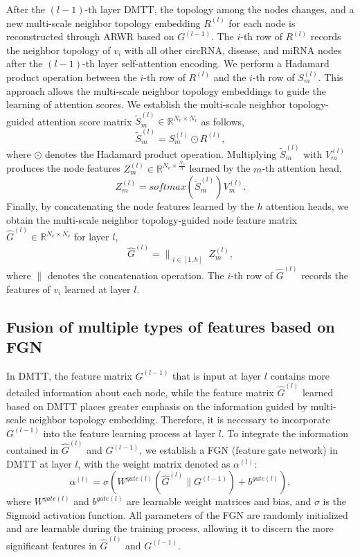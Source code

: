 \documentclass{bioinfo}
\begin{document}
\begin{methods}
After the $(l-1)$-th layer DMTT, the topology among the nodes changes, and a new multi-scale neighbor topology embedding $R^{(l)}$ for each node is reconstructed through ARWR based on $G^{(l - 1)}$. The $i$-th row of $R^{(l)}$ records the neighbor topology of $v_i$ with all other circRNA, disease, and miRNA nodes after the $(l-1)$-th layer self-attention encoding. We perform a Hadamard product operation between the $i$-th row of $R^{(l)}$ and the $i$-th row of $S_{m}^{(l)}$. This approach allows the multi-scale neighbor topology embeddings to guide the learning of attention scores. We establish the multi-scale neighbor topology-guided attention score matrix $\widetilde{S}_{m}^{(l)} \in \mathbb{R}^{N_v \times N_v}$ as follows,
\begin{equation}
	\widetilde{S}_{m}^{(l)} = S_{m}^{(l)} \odot R^{(l)},
\end{equation}
where $\odot$ denotes the Hadamard product operation. Multiplying $\widetilde{S}_{m}^{(l)}$ with $V_{m}^{(l)}$ produces the node features ${Z_{m}^{(l)}} \in \mathbb{R}^{N_v \times \frac{N_v}{h}}$ learned by the $m$-th attention head,
\begin{equation}
	{Z_{m}^{(l)}} = softmax(\widetilde{S}_{m}^{(l)})V_{m}^{(l)}.
\end{equation}
Finally, by concatenating the node features learned by the $h$ attention heads, we obtain the multi-scale neighbor topology-guided node feature matrix $\hat{G}^{(l)} \in \mathbb{R}^{N_v \times N_v}$ for layer $l$,
\begin{equation}
	\hat{G}^{(l)}= \bigg\|_{\substack{i\in {[1,h]}}} Z^{(l)}_{m},
\end{equation}
where $\|$ denotes the concatenation operation. The $i$-th row of $\hat{G}^{(l)}$ records the features of $v_i$ learned at layer $l$.

\vspace{0.3cm}


\subsection{Fusion of multiple types of features based on FGN}
In DMTT, the feature matrix ${G}^{(l - 1)}$ that is input at layer $l$ contains more detailed information about each node, while the feature matrix $\hat{G}^{(l)}$ learned based on DMTT places greater emphasis on the information guided by multi-scale neighbor topology embedding. Therefore, it is necessary to incorporate ${G}^{(l - 1)}$ into the feature learning process at layer $l$. To integrate the information contained in $\hat{G}^{(l)}$ and $G^{(l - 1)}$, we establish a FGN (feature gate network) in DMTT at layer $l$, with the weight matrix denoted as $\alpha^{(l)}$:
\begin{equation}
    \alpha^{(l)} = \sigma (W^{gate(l)}(\hat{G}^{(l)}\| G^{(l - 1)}) + b^{gate(l)}),
\end{equation}
where $W^{gate(l)}$ and $b^{gate(l)}$ are learnable weight matrices and bias, and $\sigma$ is the Sigmoid activation function. All parameters of the FGN are randomly initialized and are learnable during the training process, allowing it to discern the more significant features in $\hat{G}^{(l)}$ and $G^{(l - 1)}$.


\end{methods}
\end{document}
